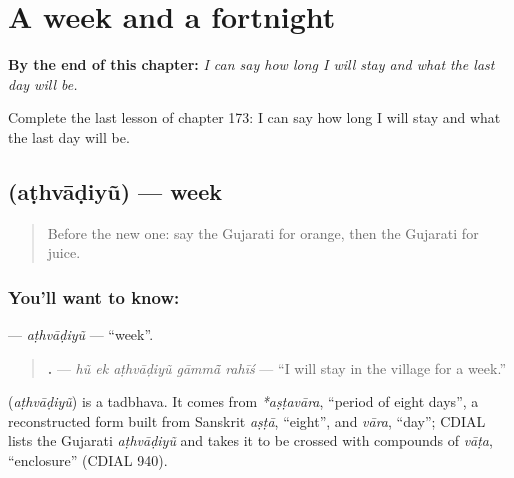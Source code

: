 
\chapter{A week and a fortnight}
\label{ch:gu-a-week-and-a-fortnight}

\begin{chapteropening}
\textbf{By the end of this chapter:} \emph{I can say how long I will stay and what the last day will be.}

Complete the last lesson of chapter 173: I can say how long I will stay and what the last day will be.
\end{chapteropening}

\section[\texorpdfstring{\gu{અઠવાડિયું} (aṭhvāḍiyũ)}{અઠવાડિયું (aṭhvāḍiyũ)}]{ (aṭhvāḍiyũ) — week}

\label{lesson:GU-C173-athvadiyu}



\begin{quote}
Before the new one: say the Gujarati for orange, then the Gujarati for juice.
\end{quote}

\subsection*{You'll want to know: }
\textbf{} — \emph{aṭhvāḍiyũ} — \textquotedblleft{}week\textquotedblright{}.

\begin{quote}
\textbf{    .} — \emph{hũ ek aṭhvāḍiyũ gāmmā̃ rahīś} — \textquotedblleft{}I will stay in the village for a week.\textquotedblright{}
\end{quote}

\begin{cousinweb}
\textbf{} (\emph{aṭhvāḍiyũ}) is a tadbhava. It comes from \emph{*aṣṭavāra}, \textquotedblleft{}period of eight days\textquotedblright{}, a reconstructed form built from Sanskrit \emph{aṣṭā}, \textquotedblleft{}eight\textquotedblright{}, and \emph{vāra}, \textquotedblleft{}day\textquotedblright{}; CDIAL lists the Gujarati \emph{aṭhvāḍiyũ} and takes it to be crossed with compounds of \emph{vāṭa}, \textquotedblleft{}enclosure\textquotedblright{} (CDIAL 940).
\end{cousinweb}

